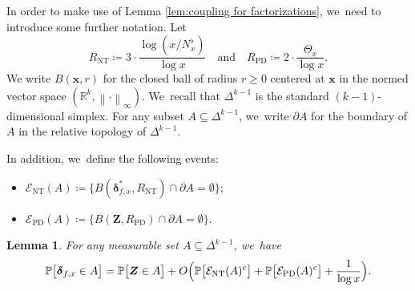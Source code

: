 \documentclass[11pt]{article}
\newcommand{\bx}{{\boldsymbol x}}
\newcommand{\bZ}{{\boldsymbol Z}}
\newcommand{\RR}{\mathbb{R}}
\newcommand{\PP}{\mathbb{P}}
\newcommand{\bolddelta}{\boldsymbol{\delta}}
\newcommand{\EC}{\mathcal{E}}
\newcommand{\maxnorm}[1]{\left\| #1 \right\|_{\infty}}
\newcommand{\simplex}{\Delta^{k-1}}
\newcommand{\bg}{\big}
\newcommand{\Rnt}{R_{\mathrm{NT}}}
\newcommand{\Rprob}{R_{\mathrm{PD}}}
\newcommand{\ECnt}{\EC_{\mathrm{NT}}}
\newcommand{\ECprob}{\EC_{\mathrm{PD}}}
\theoremstyle{plain}
\newtheorem{lem}[cor]{Lemma}
\theoremstyle{definition}
\begin{document}
In order to make use of Lemma \ref{lem:coupling for factorizations}, we~need to introduce some further notation. Let
\[
\Rnt \coloneqq 3\cdot \frac{\log(x/N_x^\flat)}{\log x} \quad \text{and} \quad \Rprob \coloneqq 2\cdot \frac{\Theta_x}{\log x}.
\]
We write $B(\bx,r)$ for the closed ball of radius $r \ge 0$ centered at $\bx$ in the normed vector space $(\RR^k, \maxnorm{\cdot})$. We~recall that $\simplex$ is the standard $(k-1)$-dimensional simplex. For any subset $A \subseteq \simplex$, we~write $\partial A$ for the boundary of $A$ in the relative topology of $\simplex$.

In addition, we~define the following events:
\begin{itemize}
\item $\ECnt(A) \coloneqq \bg\{ B(\bolddelta_{f, x}^*, \Rnt)\cap \partial A=\emptyset\bg\}$;

\item $\ECprob(A) \coloneqq \bg\{ B(\bZ, \Rprob) \cap \partial A = \emptyset \bg\}$.
\end{itemize}

\begin{lem}
\label{lem:sym diff D and Z}
For any measurable set $A\subseteq\simplex$, we~have
\[
\PP\bg[\bolddelta_{f, x} \in A\bg] = \PP\bg[\bZ \in A\bg] + O\Bigl(\PP\bg[\ECnt(A)^c\bg] + \PP\bg[\ECprob(A)^c\bg] + \frac{1}{\log x}\Bigr).
\]
\end{lem}
\end{document}
